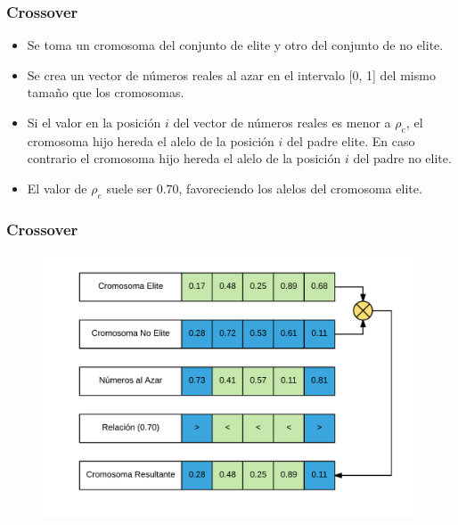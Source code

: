 \documentclass{beamer}
\begin{document}

\begin{frame}
\frametitle{Crossover}

\begin{itemize}
    \item Se toma un cromosoma del conjunto de elite y otro del conjunto de no elite.
    \pause
    \item Se crea un vector de números reales al azar en el intervalo [0, 1] del mismo tamaño que los cromosomas.
    \pause
    \item Si el valor en la posición $i$ del vector de números reales es menor a $\rho_e$, el cromosoma hijo hereda el alelo de la posición $i$ del padre elite. En caso contrario el cromosoma hijo hereda el alelo de la posición $i$ del padre no elite.
    \pause
    \item El valor de $\rho_e$ suele ser $0.70$, favoreciendo los alelos del cromosoma elite.
    \pause
\end{itemize}

\end{frame}


\begin{frame}
\frametitle{Crossover}

\begin{figure}[h]
	\centering
	\includegraphics[width=12cm]{BiasCrossover}
	\label{fig:BiasCrossover}
\end{figure}

\end{frame}

\end{document}
